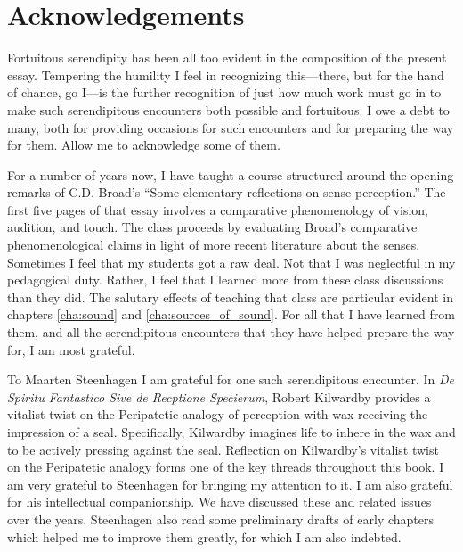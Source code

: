 \chapter*{Acknowledgements} %
\label{cha:acknowledgements}

Fortuitous serendipity has been all too evident in the composition of the present essay. Tempering the humility I feel in recognizing this---there, but for the hand of chance, go I---is the further recognition of just how much work must go in to make such serendipitous encounters both possible and fortuitous. I owe a debt to many, both for providing occasions for such encounters and for preparing the way for them. Allow me to acknowledge some of them.

For a number of years now, I have taught a course structured around the opening remarks of C.D. Broad's \citeyearpar{Broad:1952kx} ``Some elementary reflections on sense-per\-cep\-tion.'' The first five pages of that essay involves a comparative phenomenology of vision, audition, and touch. The class proceeds by evaluating Broad's comparative phenomenological claims in light of more recent literature about the senses. Sometimes I feel that my students got a raw deal. Not that I was neglectful in my pedagogical duty. Rather, I feel that I learned more from these class discussions than they did. The salutary effects of teaching that class are particular evident in chapters \ref{cha:sound} and \ref{cha:sources_of_sound}. For all that I have learned from them, and all the serendipitous encounters that they have helped prepare the way for, I am most grateful.

To Maarten Steenhagen I am grateful for one such serendipitous encounter. In \emph{De Spiritu Fantastico Sive de Recptione Specierum}, Robert Kilwardby provides a vitalist twist on the Peripatetic analogy of perception with wax receiving the impression of a seal. Specifically, Kilwardby imagines life to inhere in the wax and to be actively pressing against the seal. Reflection on Kilwardby's vitalist twist on the Peripatetic analogy forms one of the key threads throughout this book. I am very grateful to Steenhagen for bringing my attention to it. I am also grateful for his intellectual companionship. We have discussed these and related issues over the years. Steenhagen also read some preliminary drafts of early chapters which helped me to improve them greatly, for which I am also indebted.

